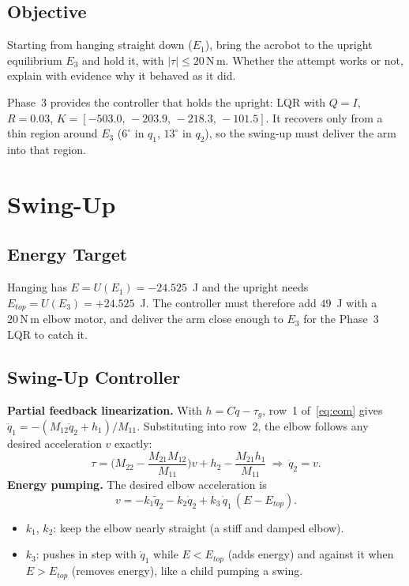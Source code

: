 \documentclass[12pt,a4paper]{article}
\newcommand{\Nm}{\,\mathrm{N\,m}}
\begin{document}
\subsection{Objective}
Starting from hanging straight down ($E_1$), bring the acrobot to the upright equilibrium $E_3$ and hold it, with $|\tau|\le20\Nm$. Whether the attempt works or not, explain with evidence why it behaved as it did.

Phase~3 provides the controller that holds the upright: LQR with $Q=I$, $R=0.03$, $K=[-503.0,\,-203.9,\,-218.3,\,-101.5]$. It recovers only from a thin region around $E_3$ ($6^\circ$ in $q_1$, $13^\circ$ in $q_2$), so the swing-up must deliver the arm into that region.

\section{Swing-Up}
\subsection{Energy Target}
Hanging has $E=U(E_1)=-24.525$~J and the upright needs $E_{top}=U(E_3)=+24.525$~J. The controller must therefore add $49$~J with a $20\Nm$ elbow motor, and deliver the arm close enough to $E_3$ for the Phase~3 LQR to catch it.

\subsection{Swing-Up Controller}
\textbf{Partial feedback linearization.} With $h=C\dot q-\tau_g$, row~1 of~\eqref{eq:eom} gives $\ddot q_1=-(M_{12}\ddot q_2+h_1)/M_{11}$. Substituting into row~2, the elbow follows any desired acceleration $v$ exactly:
\begin{equation}
\tau=\Big(M_{22}-\frac{M_{21}M_{12}}{M_{11}}\Big)v+h_2-\frac{M_{21}h_1}{M_{11}}\ \Rightarrow\ \ddot q_2=v .
\end{equation}
\textbf{Energy pumping.} The desired elbow acceleration is
\begin{equation}
v=-k_1\tilde q_2-k_2\dot q_2+k_3\,\dot q_1\,(E-E_{top}) .\label{eq:v}
\end{equation}
\begin{itemize}
\item $k_1$, $k_2$: keep the elbow nearly straight (a stiff and damped elbow).
\item $k_3$: pushes in step with $\dot q_1$ while $E<E_{top}$ (adds energy) and against it when $E>E_{top}$ (removes energy), like a child pumping a swing.
\end{itemize}
\end{document}
